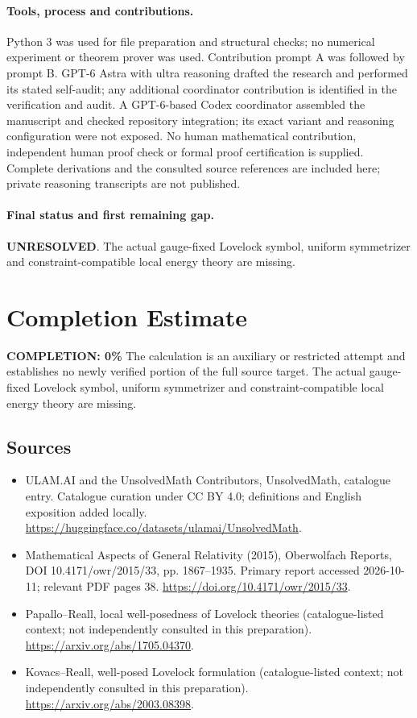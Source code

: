 \documentclass[11pt]{article}
\begin{document}
\paragraph{Tools, process and contributions.}
Python 3 was used for file preparation and structural checks; no numerical experiment or theorem prover was used. Contribution prompt A was followed by prompt B. GPT-6 Astra with ultra reasoning drafted the research and performed its stated self-audit; any additional coordinator contribution is identified in the verification and audit. A GPT-6-based Codex coordinator assembled the manuscript and checked repository integration; its exact variant and reasoning configuration were not exposed. No human mathematical contribution, independent human proof check or formal proof certification is supplied. Complete derivations and the consulted source references are included here; private reasoning transcripts are not published.

\paragraph{Final status and first remaining gap.}
\textbf{UNRESOLVED}. The actual gauge-fixed Lovelock symbol, uniform symmetrizer and constraint-compatible local energy theory are missing.

\section{Completion Estimate}
\noindent\textbf{COMPLETION: 0\%}
The calculation is an auxiliary or restricted attempt and establishes no newly verified portion of the full source target. The actual gauge-fixed Lovelock symbol, uniform symmetrizer and constraint-compatible local energy theory are missing.

\subsection{Sources}
\begin{itemize}
\item[\hypertarget{source:statement:1}{S1}] ULAM.AI and the UnsolvedMath Contributors, UnsolvedMath, catalogue entry. Catalogue curation under CC BY 4.0; definitions and English exposition added locally.
\url{https://huggingface.co/datasets/ulamai/UnsolvedMath}.
\item[\hypertarget{source:statement:2}{S2}] Mathematical Aspects of General Relativity (2015), Oberwolfach Reports, DOI 10.4171/owr/2015/33, pp. 1867--1935. Primary report accessed 2026-10-11; relevant PDF pages 38.
\url{https://doi.org/10.4171/owr/2015/33}.
\item[\hypertarget{source:statement:3}{S3}] Papallo--Reall, local well-posedness of Lovelock theories (catalogue-listed context; not independently consulted in this preparation).
\url{https://arxiv.org/abs/1705.04370}.
\item[\hypertarget{source:statement:4}{S4}] Kovacs--Reall, well-posed Lovelock formulation (catalogue-listed context; not independently consulted in this preparation).
\url{https://arxiv.org/abs/2003.08398}.
\end{itemize}
\label{end:statement}
\end{document}
